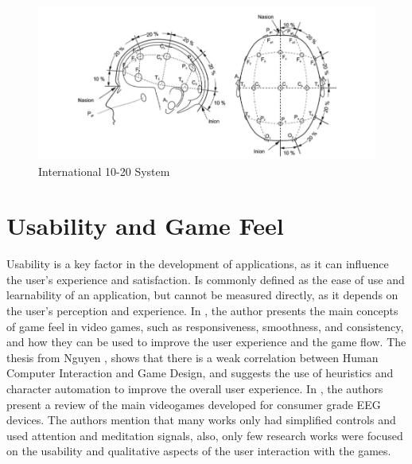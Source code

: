 \begin{figure}[htbp!]
    \centering
    \includegraphics[width=\textwidth]{Figures/Related/international_10_20_system}
    \caption{International 10-20 System}
\end{figure}
\section{Usability and Game Feel}
Usability is a key factor in the development of applications, as it can influence the user's experience and satisfaction.
Is commonly defined as the ease of use and learnability of an application, but cannot be measured directly, as it depends on the user's perception and experience.
In \cite{swink2008game}, the author presents the main concepts of game feel in video games, such as responsiveness, smoothness, and consistency, and how they can be used to improve the user experience and the game flow.
The thesis from Nguyen \cite{nguyen2012human}, shows that there is a weak correlation between Human Computer Interaction and Game Design, and suggests the use of heuristics and character automation to improve the overall user experience.
In \cite{doi:10.1080/10447318.2019.1612213}, the authors present a review of the main videogames developed for consumer grade EEG devices.
The authors mention that many works only had simplified controls and used attention and meditation signals, also, only few research works were focused on the usability and qualitative aspects of the user interaction with the games.

